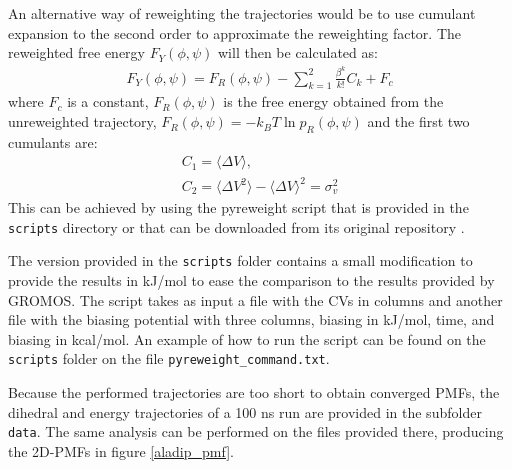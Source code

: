 An alternative way of reweighting the trajectories would be to use cumulant expansion to the second order to approximate the reweighting factor. The reweighted free energy  $F_{Y}(\phi, \psi)$ will then be calculated as:
\begin{equation}
  \begin{aligned}
 F_{Y}(\phi, \psi) = F_{R}(\phi, \psi) - \sum_{k=1}^{2} \frac{\beta^{k}}{k!}C_{k} + F_{c}
\end{aligned}
\end{equation}
where $F_{c}$ is a constant, $F_{R}(\phi, \psi)$ is the free energy obtained from the unreweighted trajectory, $F_{R}(\phi, \psi) = -k_{B}T \ln{p_{R}(\phi, \psi)}$ and the first two cumulants are:
\begin{equation}
  \begin{aligned}
C_{1} = \langle \Delta V \rangle,\\
C_{2} = \langle \Delta V^2 \rangle - \langle \Delta V \rangle^2 = \sigma^{2}_{v}
\end{aligned}
\end{equation}
This can be achieved by using the pyreweight script that is provided in the \texttt{scripts} directory or that can be downloaded from its original repository \cite{miao2014improved}.

The version provided in the \texttt{scripts} folder contains a small modification to provide the results in kJ/mol to ease the comparison to the results provided by GROMOS. The script takes as input a file with the CVs in columns and another file with the biasing potential with three columns, biasing in kJ/mol, time, and biasing in kcal/mol. An example of how to run the script can be found on the \texttt{scripts} folder on the file \texttt{pyreweight\_command.txt}.

Because the performed trajectories are too short to obtain converged PMFs, the dihedral and energy trajectories of a 100 ns run are provided in the subfolder \texttt{data}. The same analysis can be performed on the files provided there, producing the 2D-PMFs in figure \ref{aladip_pmf}.

